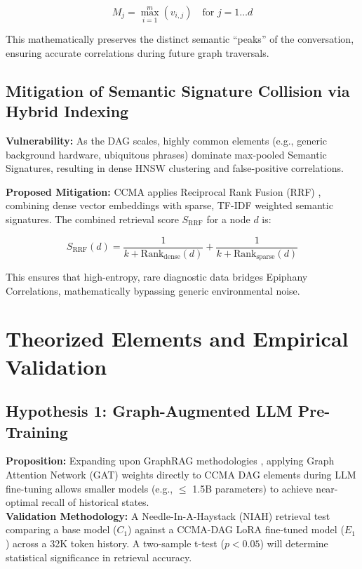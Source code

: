 \documentclass[11pt, a4paper]{article}
\begin{document}
	\begin{equation}
		M_j = \max_{i=1}^{m} (v_{i,j}) \quad \text{for } j = 1 \dots d
	\end{equation}
	
	This mathematically preserves the distinct semantic ``peaks'' of the conversation, ensuring accurate correlations during future graph traversals.
	
	\subsection{Mitigation of Semantic Signature Collision via Hybrid Indexing}
	\textbf{Vulnerability:} As the DAG scales, highly common elements (e.g., generic background hardware, ubiquitous phrases) dominate max-pooled Semantic Signatures, resulting in dense HNSW clustering and false-positive correlations.
	
	\noindent\textbf{Proposed Mitigation:} CCMA applies Reciprocal Rank Fusion (RRF) \cite{cormack2009rrf}, combining dense vector embeddings with sparse, TF-IDF weighted semantic signatures. The combined retrieval score $S_{\text{RRF}}$ for a node $d$ is:
	
	\begin{equation}
		S_{\text{RRF}}(d) = \frac{1}{k + \text{Rank}_{\text{dense}}(d)} + \frac{1}{k + \text{Rank}_{\text{sparse}}(d)}
	\end{equation}
	
	This ensures that high-entropy, rare diagnostic data bridges Epiphany Correlations, mathematically bypassing generic environmental noise.
	
	\section{Theorized Elements and Empirical Validation}
	
	\subsection{Hypothesis 1: Graph-Augmented LLM Pre-Training}
	\textbf{Proposition:} Expanding upon GraphRAG methodologies \cite{microsoft2024graphrag}, applying Graph Attention Network (GAT) weights directly to CCMA DAG elements during LLM fine-tuning allows smaller models (e.g., $\leq$ 1.5B parameters) to achieve near-optimal recall of historical states.\\
	\textbf{Validation Methodology:} A Needle-In-A-Haystack (NIAH) retrieval test comparing a base model ($C_1$) against a CCMA-DAG LoRA fine-tuned model ($E_1$) across a 32K token history. A two-sample t-test ($p < 0.05$) will determine statistical significance in retrieval accuracy.
	
\end{document}

